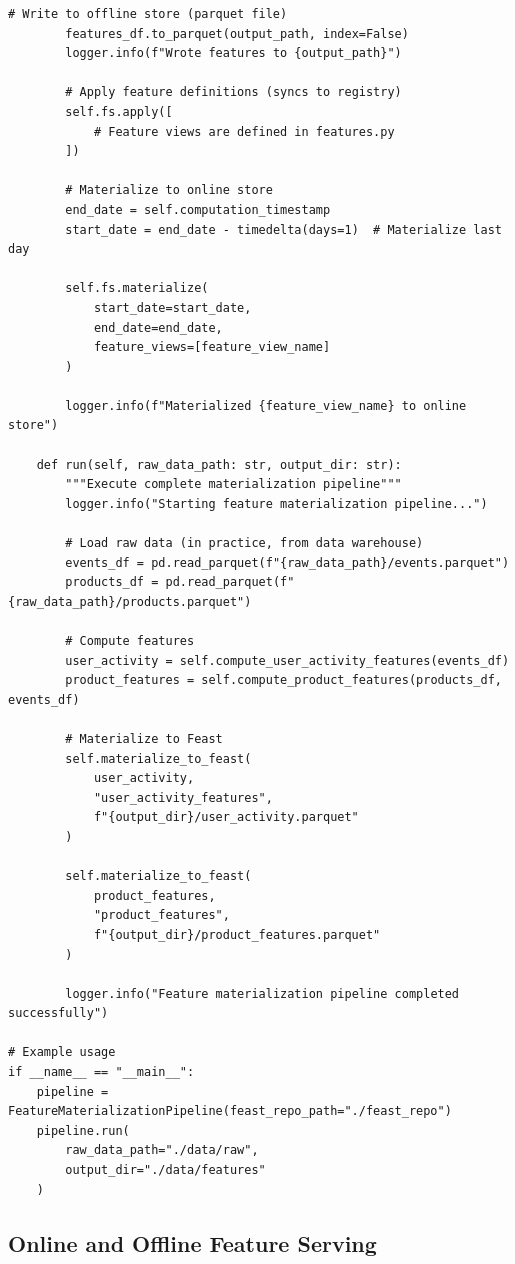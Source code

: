\begin{lstlisting}[style=python, caption=Production feature materialization pipeline]
        # Write to offline store (parquet file)
        features_df.to_parquet(output_path, index=False)
        logger.info(f"Wrote features to {output_path}")

        # Apply feature definitions (syncs to registry)
        self.fs.apply([
            # Feature views are defined in features.py
        ])

        # Materialize to online store
        end_date = self.computation_timestamp
        start_date = end_date - timedelta(days=1)  # Materialize last day

        self.fs.materialize(
            start_date=start_date,
            end_date=end_date,
            feature_views=[feature_view_name]
        )

        logger.info(f"Materialized {feature_view_name} to online store")

    def run(self, raw_data_path: str, output_dir: str):
        """Execute complete materialization pipeline"""
        logger.info("Starting feature materialization pipeline...")

        # Load raw data (in practice, from data warehouse)
        events_df = pd.read_parquet(f"{raw_data_path}/events.parquet")
        products_df = pd.read_parquet(f"{raw_data_path}/products.parquet")

        # Compute features
        user_activity = self.compute_user_activity_features(events_df)
        product_features = self.compute_product_features(products_df, events_df)

        # Materialize to Feast
        self.materialize_to_feast(
            user_activity,
            "user_activity_features",
            f"{output_dir}/user_activity.parquet"
        )

        self.materialize_to_feast(
            product_features,
            "product_features",
            f"{output_dir}/product_features.parquet"
        )

        logger.info("Feature materialization pipeline completed successfully")

# Example usage
if __name__ == "__main__":
    pipeline = FeatureMaterializationPipeline(feast_repo_path="./feast_repo")
    pipeline.run(
        raw_data_path="./data/raw",
        output_dir="./data/features"
    )
\end{lstlisting}

\subsection{Online and Offline Feature Serving}

